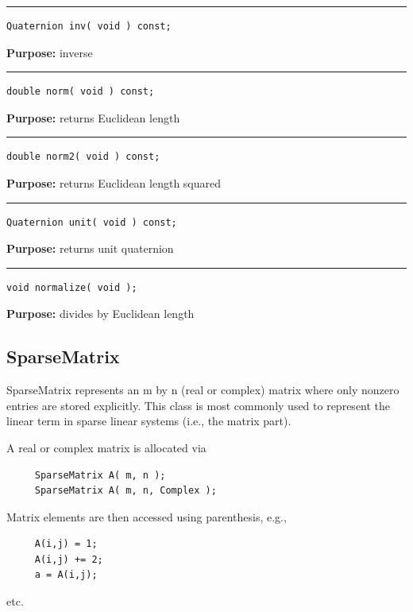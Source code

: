 \documentclass{article}
\begin{document}
\hspace{-.21in}\rule{5in}{1pt}
\begin{verbatim}
Quaternion inv( void ) const;
\end{verbatim}
\textbf{Purpose:}
inverse

\hspace{-.21in}\rule{5in}{1pt}
\begin{verbatim}
double norm( void ) const;
\end{verbatim}
\textbf{Purpose:}
returns Euclidean length

\hspace{-.21in}\rule{5in}{1pt}
\begin{verbatim}
double norm2( void ) const;
\end{verbatim}
\textbf{Purpose:}
returns Euclidean length squared

\hspace{-.21in}\rule{5in}{1pt}
\begin{verbatim}
Quaternion unit( void ) const;
\end{verbatim}
\textbf{Purpose:}
returns unit quaternion

\hspace{-.21in}\rule{5in}{1pt}
\begin{verbatim}
void normalize( void );
\end{verbatim}
\textbf{Purpose:}
divides by Euclidean length

\pagebreak
\subsection{SparseMatrix}

 

 SparseMatrix represents an m by n (real or complex) matrix where only nonzero entries are stored explicitly.  This class is most commonly used to represent the linear term in sparse linear systems (i.e., the matrix part). 

 A real or complex matrix is allocated via 

 \begin{verbatim}
     SparseMatrix A( m, n );
     SparseMatrix A( m, n, Complex );
 \end{verbatim}
\vspace{-\baselineskip} Matrix elements are then accessed using parenthesis, e.g., 

 \begin{verbatim}
     A(i,j) = 1;
     A(i,j) += 2;
     a = A(i,j);
 \end{verbatim}
\vspace{-\baselineskip} etc. 
\end{document}
